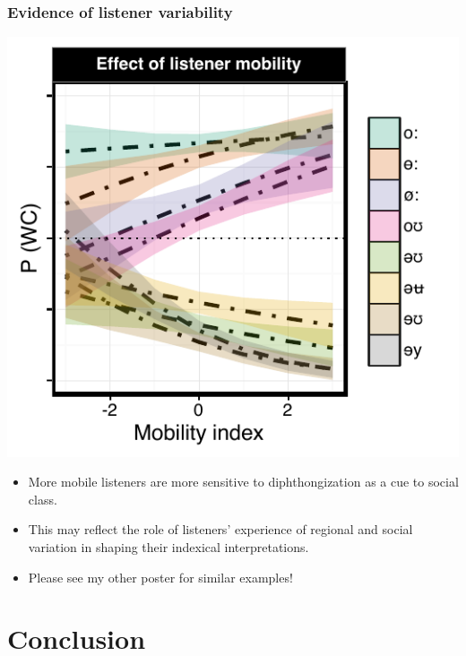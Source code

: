 \documentclass[a0,portrait]{a0poster}
\begin{document}
\begin{multicols*}{3}
\subsubsection*{Evidence of listener variability}
\hspace*{-1cm}
\begin{minipage}{0.2\textwidth}
\includegraphics[scale=2.2]{o_perception_dim3_sd_main.pdf}
\end{minipage}
\hspace*{1.75cm}
\begin{minipage}{0.12\textwidth}
\raggedright
\begin{itemize}
\item{More mobile listeners are more sensitive to diphthongization as a cue to social class.}
\item{This may reflect the role of listeners' experience of regional and social variation in shaping their indexical interpretations.}
\item{Please see my other poster for similar examples!}
\end{itemize}
\end{minipage}
\vspace*{-1cm}
\section*{Conclusion}


\end{multicols*}
\end{document}
